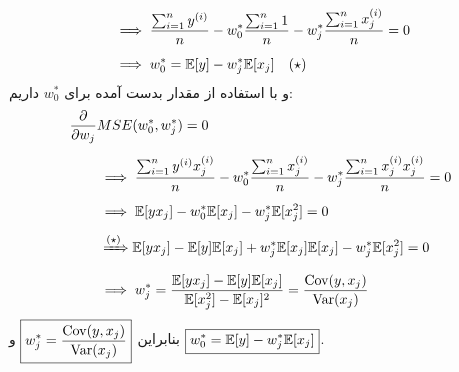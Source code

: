 \documentclass[a4paper, 12pt]{article}
\begin{document}
\begin{enumerate}[A)]
\[\begin{aligned}
		&\implies \frac{\sum_{i=1}^n y^{(i)}}{n} - w_0^\ast\frac{\sum_{i=1}^n 1}{n} - w_j^\ast \frac{\sum_{i=1}^n x_j^{(i)}}{n} = 0 \\[0.5em]
		&\implies w_0^\ast = {\mathbb E}[y] - w_j^\ast {\mathbb E}[x_j] \quad (\star)
	\end{aligned}
	\]
	و با استفاده از مقدار بدست آمده برای $w_0^\ast$ داریم:
	\[
	\begin{aligned}
		\frac{\partial}{\partial w_j}&MSE(w_0^\ast, w_j^\ast) = 0 \\[0.5em]
		&\implies \frac{\sum_{i=1}^n y^{(i)}x_j^{(i)}}{n} - w_0^\ast \frac{\sum_{i=1}^n x_j^{(i)}}{n} - w_j^\ast \frac{\sum_{i=1}^n x_j^{(i)}x_j^{(i)}}{n} = 0 \\[0.5em]
		&\implies {\mathbb E}[yx_j] - w_0^\ast {\mathbb E}[x_j] - w_j^\ast {\mathbb E}[x_j^2] = 0 \\[0.5em]
		&\,\xRightarrow{(\star)} {\mathbb E}[yx_j] - {\mathbb E}[y]{\mathbb E}[x_j] + w_j^\ast {\mathbb E}[x_j]{\mathbb E}[x_j] - w_j^\ast {\mathbb E}[x_j^2] = 0 \\[0.5em]
		&\implies w_j^\ast = \frac{{\mathbb E}[yx_j] - {\mathbb E}[y]{\mathbb E}[x_j]}{{\mathbb E}[x_j^2] - {\mathbb E}[x_j]^2} = \frac{\mathrm{Cov}(y, x_j)}{\mathrm{Var}(x_j)}
	\end{aligned}
	\]
	بنابراین
	$\boxed{w_j^\ast = \frac{\mathrm{Cov}(y, x_j)}{\mathrm{Var}(x_j)}}$
	و
	$\boxed{w_0^\ast = {\mathbb E}[y] - w_j^\ast {\mathbb E}[x_j]}$.
\end{enumerate}
\end{document}
